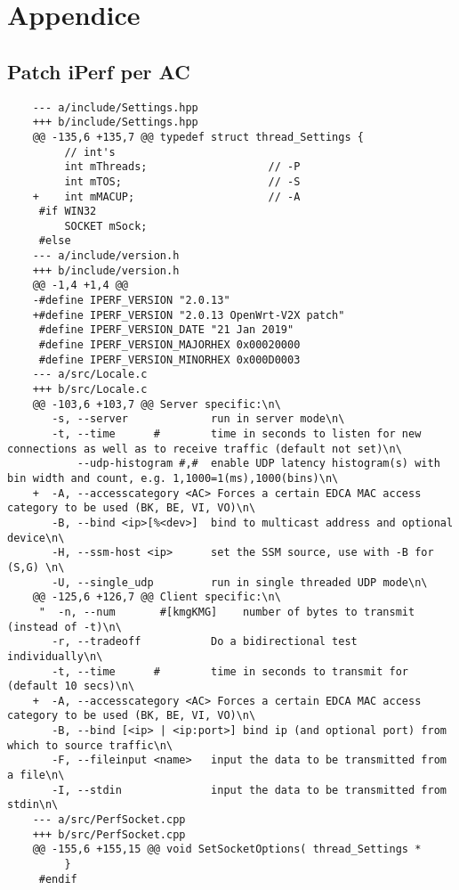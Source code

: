 \chapter{Appendice}

\section{Patch iPerf per AC}
\begin{lstlisting}
    --- a/include/Settings.hpp
    +++ b/include/Settings.hpp
    @@ -135,6 +135,7 @@ typedef struct thread_Settings {
         // int's
         int mThreads;                   // -P
         int mTOS;                       // -S
    +    int mMACUP;                     // -A
     #if WIN32
         SOCKET mSock;
     #else
    --- a/include/version.h
    +++ b/include/version.h
    @@ -1,4 +1,4 @@
    -#define IPERF_VERSION "2.0.13"
    +#define IPERF_VERSION "2.0.13 OpenWrt-V2X patch"
     #define IPERF_VERSION_DATE "21 Jan 2019"
     #define IPERF_VERSION_MAJORHEX 0x00020000
     #define IPERF_VERSION_MINORHEX 0x000D0003
    --- a/src/Locale.c
    +++ b/src/Locale.c
    @@ -103,6 +103,7 @@ Server specific:\n\
       -s, --server             run in server mode\n\
       -t, --time      #        time in seconds to listen for new connections as well as to receive traffic (default not set)\n\
           --udp-histogram #,#  enable UDP latency histogram(s) with bin width and count, e.g. 1,1000=1(ms),1000(bins)\n\
    +  -A, --accesscategory <AC> Forces a certain EDCA MAC access category to be used (BK, BE, VI, VO)\n\
       -B, --bind <ip>[%<dev>]  bind to multicast address and optional device\n\
       -H, --ssm-host <ip>      set the SSM source, use with -B for (S,G) \n\
       -U, --single_udp         run in single threaded UDP mode\n\
    @@ -125,6 +126,7 @@ Client specific:\n\
     "  -n, --num       #[kmgKMG]    number of bytes to transmit (instead of -t)\n\
       -r, --tradeoff           Do a bidirectional test individually\n\
       -t, --time      #        time in seconds to transmit for (default 10 secs)\n\
    +  -A, --accesscategory <AC> Forces a certain EDCA MAC access category to be used (BK, BE, VI, VO)\n\
       -B, --bind [<ip> | <ip:port>] bind ip (and optional port) from which to source traffic\n\
       -F, --fileinput <name>   input the data to be transmitted from a file\n\
       -I, --stdin              input the data to be transmitted from stdin\n\
    --- a/src/PerfSocket.cpp
    +++ b/src/PerfSocket.cpp
    @@ -155,6 +155,15 @@ void SetSocketOptions( thread_Settings *
         }
     #endif
     

\end{lstlisting}
